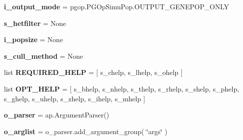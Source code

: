 \begin{DoxyCompactItemize}
\item 
{\bfseries i\+\_\+output\+\_\+mode} = pgop.\+P\+G\+Op\+Simu\+Pop.\+O\+U\+T\+P\+U\+T\+\_\+\+G\+E\+N\+E\+P\+O\+P\+\_\+\+O\+N\+LY\hypertarget{namespacenegui_1_1pgdrivesimulation_a1e943b224e3c887a9b7309072e568265}{}\label{namespacenegui_1_1pgdrivesimulation_a1e943b224e3c887a9b7309072e568265}

\item 
{\bfseries s\+\_\+hetfilter} = None\hypertarget{namespacenegui_1_1pgdrivesimulation_ae89a44724b0df9f2393315d2993f4774}{}\label{namespacenegui_1_1pgdrivesimulation_ae89a44724b0df9f2393315d2993f4774}

\item 
{\bfseries i\+\_\+popsize} = None\hypertarget{namespacenegui_1_1pgdrivesimulation_ad37d81de220560255168fba65254df59}{}\label{namespacenegui_1_1pgdrivesimulation_ad37d81de220560255168fba65254df59}

\item 
{\bfseries s\+\_\+cull\+\_\+method} = None\hypertarget{namespacenegui_1_1pgdrivesimulation_a35c95d326162f161be40ba2dea5dbfab}{}\label{namespacenegui_1_1pgdrivesimulation_a35c95d326162f161be40ba2dea5dbfab}

\item 
list {\bfseries R\+E\+Q\+U\+I\+R\+E\+D\+\_\+\+H\+E\+LP} = \mbox{[} s\+\_\+chelp, s\+\_\+lhelp, s\+\_\+ohelp \mbox{]}\hypertarget{namespacenegui_1_1pgdrivesimulation_ae9d3fff0e76417c9289d5bec11b76151}{}\label{namespacenegui_1_1pgdrivesimulation_ae9d3fff0e76417c9289d5bec11b76151}

\item 
list {\bfseries O\+P\+T\+\_\+\+H\+E\+LP} = \mbox{[} s\+\_\+bhelp, s\+\_\+nhelp, s\+\_\+thelp, s\+\_\+rhelp, s\+\_\+shelp, s\+\_\+phelp, s\+\_\+ghelp, s\+\_\+uhelp, s\+\_\+zhelp, s\+\_\+ihelp, s\+\_\+mhelp \mbox{]}\hypertarget{namespacenegui_1_1pgdrivesimulation_a1e340649ae6d7ee8647ddb9d1bd6b41b}{}\label{namespacenegui_1_1pgdrivesimulation_a1e340649ae6d7ee8647ddb9d1bd6b41b}

\item 
{\bfseries o\+\_\+parser} = ap.\+Argument\+Parser()\hypertarget{namespacenegui_1_1pgdrivesimulation_a3a02cb6a8bbda4e0ee70ba4a6394e2ed}{}\label{namespacenegui_1_1pgdrivesimulation_a3a02cb6a8bbda4e0ee70ba4a6394e2ed}

\item 
{\bfseries o\+\_\+arglist} = o\+\_\+parser.\+add\+\_\+argument\+\_\+group( \char`\"{}args\char`\"{} )\hypertarget{namespacenegui_1_1pgdrivesimulation_a9b67fb85b9e2fd013f472858e594ec8e}{}\label{namespacenegui_1_1pgdrivesimulation_a9b67fb85b9e2fd013f472858e594ec8e}


\end{DoxyCompactItemize}
